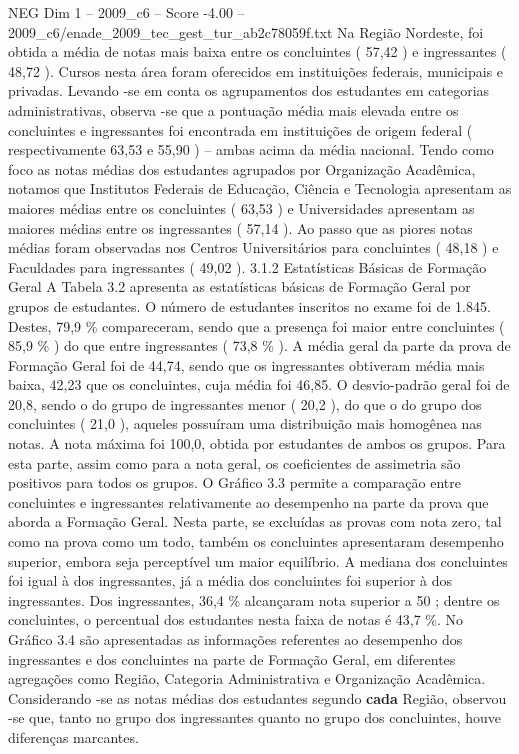 \begin{textsample}{NEG Dim 1 – 2009\_c6 – Score -4.00 – 2009\_c6/enade\_2009\_tec\_gest\_tur\_ab2c78059f.txt}
Na Região Nordeste, foi obtida a média de notas mais baixa entre os concluintes ( 57,42 ) e ingressantes ( 48,72 ).
Cursos nesta área foram oferecidos em instituições federais, municipais e privadas.
Levando -se em conta os agrupamentos dos estudantes em categorias administrativas, observa -se que a pontuação média mais elevada entre os concluintes e ingressantes foi encontrada em instituições de origem federal ( respectivamente 63,53 e 55,90 ) – ambas acima da média nacional.
Tendo como foco as notas médias dos estudantes agrupados por Organização Acadêmica, notamos que Institutos Federais de Educação, Ciência e Tecnologia apresentam as maiores médias entre os concluintes ( 63,53 ) e Universidades apresentam as maiores médias entre os ingressantes ( 57,14 ).
Ao passo que as piores notas médias foram observadas nos Centros Universitários para concluintes ( 48,18 ) e Faculdades para ingressantes ( 49,02 ). 3.1.2 Estatísticas Básicas de Formação Geral A Tabela 3.2 apresenta as estatísticas básicas de Formação Geral por grupos de estudantes.
O número de estudantes inscritos no exame foi de 1.845.
Destes, 79,9 \% compareceram, sendo que a presença foi maior entre concluintes ( 85,9 \% ) do que entre ingressantes ( 73,8 \% ).
A média geral da parte da prova de Formação Geral foi de 44,74, sendo que os ingressantes obtiveram média mais baixa, 42,23 que os concluintes, cuja média foi 46,85.
O desvio-padrão geral foi de 20,8, sendo o do grupo de ingressantes menor ( 20,2 ), do que o do grupo dos concluintes ( 21,0 ), aqueles possuíram uma distribuição mais homogênea nas notas.
A nota máxima foi 100,0, obtida por estudantes de ambos os grupos.
Para esta parte, assim como para a nota geral, os coeficientes de assimetria são positivos para todos os grupos.
O Gráfico 3.3 permite a comparação entre concluintes e ingressantes relativamente ao desempenho na parte da prova que aborda a Formação Geral.
Nesta parte, se excluídas as provas com nota zero, tal como na prova como um todo, também os concluintes apresentaram desempenho superior, embora seja perceptível um maior equilíbrio.
A mediana dos concluintes foi igual à dos ingressantes, já a média dos concluintes foi superior à dos ingressantes.
Dos ingressantes, 36,4 \% alcançaram nota superior a 50 ; dentre os concluintes, o percentual dos estudantes nesta faixa de notas é 43,7 \%.
No Gráfico 3.4 são apresentadas as informações referentes ao desempenho dos ingressantes e dos concluintes na parte de Formação Geral, em diferentes agregações como Região, Categoria Administrativa e Organização Acadêmica.
Considerando -se as notas médias dos estudantes segundo \textbf{cada} Região, observou -se que, tanto no grupo dos ingressantes quanto no grupo dos concluintes, houve diferenças marcantes.

\end{textsample}
